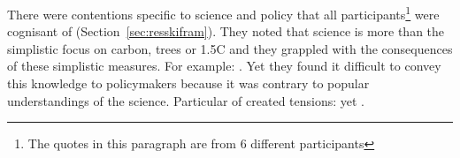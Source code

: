 There were contentions specific to \CAN{} science and policy that all participants\footnote{The quotes in this paragraph are from 6 different participants} were cognisant of (Section~\ref{sec:resskifram}). They noted that \CAN{} science is more than the simplistic focus on carbon, trees or 1.5\degree C and they grappled with the consequences of these simplistic measures. For example: . Yet they found it difficult to convey this knowledge to policymakers because it was contrary to popular understandings of the science. Particular \skifram{} of \CAN{} created tensions:   yet . %
